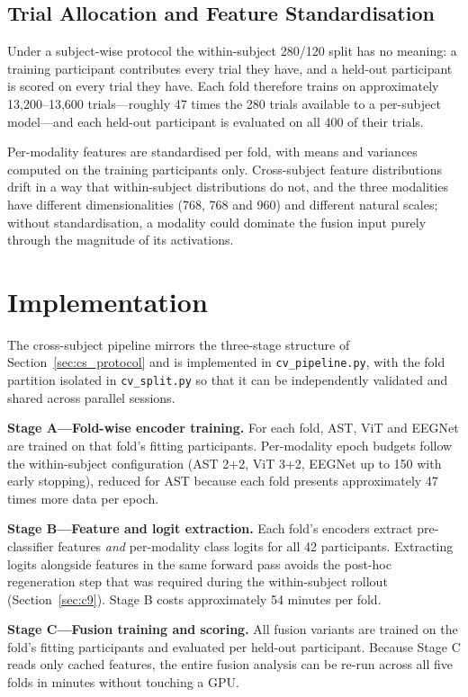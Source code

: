 \subsection{Trial Allocation and Feature Standardisation}

Under a subject-wise protocol the within-subject 280/120 split has no meaning: a
training participant contributes every trial they have, and a held-out participant is
scored on every trial they have. Each fold therefore trains on approximately
13,200--13,600 trials---roughly 47 times the 280 trials available to a per-subject
model---and each held-out participant is evaluated on all 400 of their trials.

Per-modality features are standardised per fold, with means and variances computed on
the training participants only. Cross-subject feature distributions drift in a way
that within-subject distributions do not, and the three modalities have different
dimensionalities (768, 768 and 960) and different natural scales; without
standardisation, a modality could dominate the fusion input purely through the
magnitude of its activations.

\section{Implementation}
\label{sec:cs_implementation}

The cross-subject pipeline mirrors the three-stage structure of
Section~\ref{sec:cs_protocol} and is implemented in \texttt{cv\_pipeline.py}, with the
fold partition isolated in \texttt{cv\_split.py} so that it can be independently
validated and shared across parallel sessions.

\textbf{Stage A---Fold-wise encoder training.} For each fold, AST, ViT and EEGNet are
trained on that fold's fitting participants. Per-modality epoch budgets follow the
within-subject configuration (AST 2+2, ViT 3+2, EEGNet up to 150 with early stopping),
reduced for AST because each fold presents approximately 47 times more data per epoch.

\textbf{Stage B---Feature and logit extraction.} Each fold's encoders extract
pre-classifier features \emph{and} per-modality class logits for all 42 participants.
Extracting logits alongside features in the same forward pass avoids the post-hoc
regeneration step that was required during the within-subject rollout
(Section~\ref{sec:c9}). Stage B costs approximately 54 minutes per fold.

\textbf{Stage C---Fusion training and scoring.} All fusion variants are trained on the
fold's fitting participants and evaluated per held-out participant. Because Stage C
reads only cached features, the entire fusion analysis can be re-run across all five
folds in minutes without touching a GPU.

